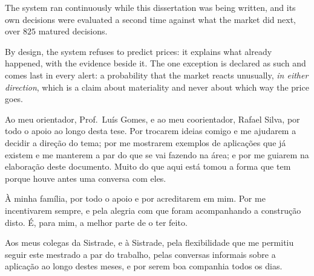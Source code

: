 \begin{abstractotherlanguage}
The system ran continuously while this dissertation was being written, and its own decisions were evaluated a second time against what the market did next, over $825$ matured decisions.

By design, the system refuses to predict prices: it explains what already happened, with the
evidence beside it. The one exception is declared as such and comes last in every alert: a
probability that the market reacts unusually, \emph{in either direction}, which is a claim
about materiality and never about which way the price goes.
\end{abstractotherlanguage}

\begin{acknowledgements}
Ao meu orientador, Prof.\ Luís Gomes, e ao meu coorientador, Rafael Silva, por todo o apoio ao longo
desta tese. Por trocarem ideias comigo e me ajudarem a decidir a direção do tema; por me mostrarem
exemplos de aplicações que já existem e me manterem a par do que se vai fazendo na área; e por me
guiarem na elaboração deste documento. Muito do que aqui está tomou a forma que tem porque houve
antes uma conversa com eles.

À minha família, por todo o apoio e por acreditarem em mim. Por me incentivarem sempre, e pela
alegria com que foram acompanhando a construção disto. É, para mim, a melhor parte de o ter
feito.

Aos meus colegas da Sistrade, e à Sistrade, pela flexibilidade que me permitiu seguir este mestrado
a par do trabalho, pelas conversas informais sobre a aplicação ao longo destes meses, e por serem
boa companhia todos os dias.
\end{acknowledgements}

\tableofcontents
\listoffigures
\listoftables
\renewcommand{\lstlistlistingname}{Lista de Excertos de Código}
\renewcommand{\lstlistingname}{Excerto}
\lstlistoflistings

\printnoidxglossary[type=\acronymtype, title=Lista de Acrónimos, nonumberlist]

\mainmatter
\pagestyle{thesis}
